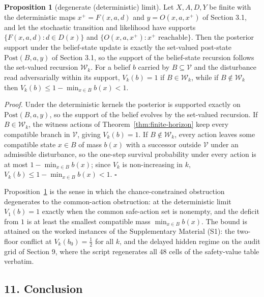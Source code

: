 \documentclass[10pt,twocolumn]{article}
\theoremstyle{definition}
\newtheorem{proposition}{Proposition}
\begin{document}
\begin{proposition}[degenerate (deterministic) limit]\label{prop:degenerate}
Let \(X, A, D, Y\) be finite with the deterministic maps \(x^{+} = F(x,a,d)\) and \(y = O(x,a,x^{+})\) of Section 3.1, and let the stochastic transition and likelihood have supports \(\{F(x,a,d) : d \in D(x)\}\) and \(\{O(x,a,x^{+}) : x^{+} \text{ reachable}\}\). Then the posterior support under the belief-state update is exactly the set-valued post-state \(\mathrm{Post}(B,a,y)\) of Section 3.1, so the support of the belief-state recursion follows the set-valued recursion \(\mathcal{W}_{k}\). For a belief \(b\) carried by \(B \subseteq \mathcal{V}\) and the disturbance read adversarially within its support, \(V_{k}(b) = 1\) if \(B \in \mathcal{W}_{k}\), while if \(B \notin \mathcal{W}_{k}\) then \(V_{k}(b) \le 1 - \min_{x \in B} b(x) < 1\).
\end{proposition}

\emph{Proof.} Under the deterministic kernels the posterior is supported exactly on \(\mathrm{Post}(B,a,y)\), so the support of the belief evolves by the set-valued recursion. If \(B \in \mathcal{W}_{k}\), the witness actions of Theorem~\ref{thm:finite-horizon} keep every compatible branch in \(\mathcal{V}\), giving \(V_{k}(b) = 1\). If \(B \notin \mathcal{W}_{k}\), every action leaves some compatible state \(x \in B\) of mass \(b(x)\) with a successor outside \(\mathcal{V}\) under an admissible disturbance, so the one-step survival probability under every action is at most \(1 - \min_{x \in B} b(x)\); since \(V_{k}\) is non-increasing in \(k\), \(V_{k}(b) \le 1 - \min_{x \in B} b(x) < 1\). \hfill\(\square\)

Proposition~\ref{prop:degenerate} is the sense in which the chance-constrained obstruction degenerates to the common-action obstruction: at the deterministic limit \(V_{1}(b) = 1\) exactly when the common safe-action set is nonempty, and the deficit from \(1\) is at least the smallest compatible mass \(\min_{x \in B} b(x)\). The bound is attained on the worked instances of the Supplementary Material (S1): the two-floor conflict at \(V_{k}(b_{0}) = \tfrac{1}{2}\) for all \(k\), and the delayed hidden regime on the audit grid of Section 9, where the script regenerates all 48 cells of the safety-value table verbatim.

\subsection{11. Conclusion}\label{conclusion}
\end{document}
